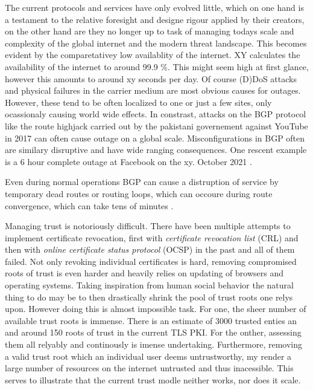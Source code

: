 \documentclass[../eva1_scion.tex]{subfiles}
\begin{document}
The current protocols and services have only evolved little, which on one hand is a testament to the relative foresight and designe rigour applied by their creators, on the other hand are they no longer up to task of managing todays scale and complexity of the global internet and the modern threat landscape. This becomes evident by the comparetativey low availablity of the internet. XY calculates the availability of the internet to around 99.9 \%. This might seem high at first glance, however this amounts to around xy seconds per day. Of course (D)DoS attacks and physical failures in the carrier medium are most obvious causes for outages. However, these tend to be often localized to one or just a few sites, only ocassionaly causing world wide effects. In constrast, attacks on the BGP protocol like the route highjack carried out by the pakistani governement against YouTube in 2017 \cite{youtbe_highjack} can often cause outage on a global scale. Misconfigurations in BGP often are similary disruptive and have wide ranging consequences. One rescent example is a 6 hour complete outage at Facebook on the xy. October 2021 \cite{facebook_oups}.

Even during normal operations BGP can cause a distruption of service by temporary dead routes or routing loops, which can occoure during route convergence, which can take tens of minutes \cite{route_convergence}.

Managing trust is notoriously difficult. There have been multiple attempts to implement certificate revocation, first with \textit{certificate revocation list} (CRL) \cite{rfc_crl} and then with \textit{online certificate status protocol} (OCSP) \cite{rfc_opsc} in the past and all of them failed. Not only revoking individual certificates is hard, removing compromised roots of trust is even harder and heavily relies on updating of browsers and operating systems. Taking inspiration from human social behavior the natural thing to do may be to then drastically shrink the pool of trust roots one relys upon. However doing this is almost impossible task. For one, the sheer number of available trust roots is immense. There is an estimate of 3000 \cite{trusted_entities} trusted enties an and around 150 roots of trust in the current TLS PKI. For the onther, assessing them all relyably and continously is imense undertaking. Furthermore, removing a valid trust root which an individual user deems untrustworthy, my render a large number of resources on the internet untrusted and thus inacessible. This serves to illustrate that the current trust modle neither works, nor does it scale. 
\end{document}
